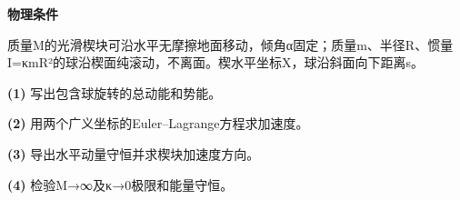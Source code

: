 \textbf{物理条件}\par 质量M的光滑楔块可沿水平无摩擦地面移动，倾角α固定；质量m、半径R、惯量I=κmR²的球沿楔面纯滚动，不离面。楔水平坐标X，球沿斜面向下距离s。
\par\noindent\textbf{(1)} 写出包含球旋转的总动能和势能。
\par\noindent\textbf{(2)} 用两个广义坐标的Euler–Lagrange方程求加速度。
\par\noindent\textbf{(3)} 导出水平动量守恒并求楔块加速度方向。
\par\noindent\textbf{(4)} 检验M→∞及κ→0极限和能量守恒。
